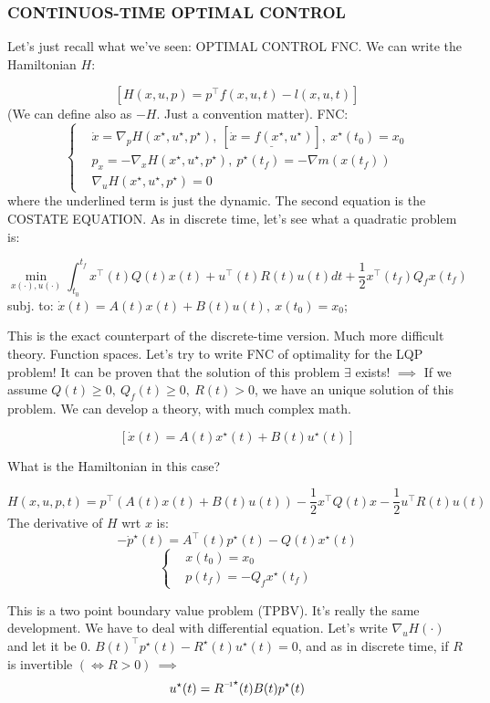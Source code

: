\subsubsection{CONTINUOS-TIME OPTIMAL CONTROL}

Let's just recall what we've seen:
OPTIMAL CONTROL FNC. We can write the Hamiltonian $H$:

\[
	[H(x,u,p) = p^\top f(x,u,t) - l(x,u,t)]
\]
(We can define also as $-H$. Just a convention matter).
FNC:
\[	
	\left\{
	\begin{aligned}
	&\dot{x} = \nabla_p{H(x^\star,u^\star,p^\star)},\ [\underline{\dot{x}=f(x^\star,u^\star)}],\ x^\star(t_0) = x_0\\
	&p_x = -\nabla_x{H(x^\star,u^\star,p^\star)},\ p^\star(t_f) = -\nabla{m(x(t_f))}\\
	&\nabla_u{H(x^\star,u^\star,p^\star)} = 0
	\end{aligned}
	\right.
\]
where the underlined term is just the dynamic. The second equation is the COSTATE EQUATION. As in discrete time, let's see what a quadratic problem is:

\[
	\min_{x(\mathord{\cdot}),u(\mathord{\cdot})}{\int_{t_0}^{t_f}{x^\top(t)Q(t)x(t) + u^\top(t)R(t)u(t)dt} + \frac{1}{2}x^\top(t_f)Q_fx(t_f)}
\]
subj. to: $\dot{x}(t) = A(t)x(t) + B(t)u(t),\ x(t_0) = x_0$;

This is the exact counterpart of the discrete-time version. Much more difficult theory. Function spaces. Let's try to write FNC of optimality for the LQP problem! It can be proven that the solution of this problem $\exists$ exists! $\implies$ If we assume $Q(t)\geq 0,\ Q_f(t)\geq 0,\ R(t)>0$, we have an unique solution of this problem. We can develop a theory, with much complex math.

\[
	[\dot{x}(t) = A(t)x^\star(t) + B(t)u^\star(t)]
\]

What is the Hamiltonian in this case?

\[
	H(x,u,p,t) = p^\top(A(t)x(t) + B(t)u(t)) - \frac{1}{2}x^\top Q(t)x -\frac{1}{2}u^\top R(t)u(t)
\]
The derivative of $H$ wrt $x$ is:
\[
	-\dot{p}^\star(t) = A^\top(t)p^\star(t) - Q(t)x^\star(t)
\]	
\[
	\left\{
	\begin{aligned}
	&x(t_0) = x_0\\
	&p(t_f) = -Q_fx^\star(t_f)
	\end{aligned}
	\right.
\]

This is a two point boundary value problem (TPBV). It's really the same development. We have to deal with differential equation. Let's write $\nabla_u{H(\mathord{\cdot})}$ and let it be 0. $B(t)^\top p^\star(t) - R^\star(t)u^\star(t) = 0$, and as in discrete time, if $R$ is invertible $(\iff R>0)\ \implies$
\[
	u^\star(t) = \inv{R}^\star(t)B(t)p^\star(t)
\]

